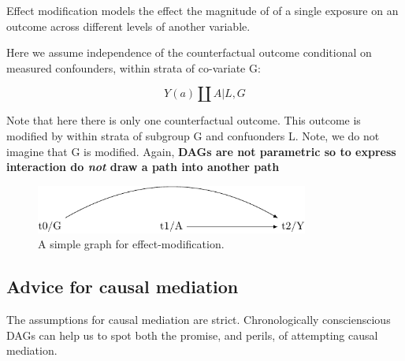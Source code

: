 \documentclass[
  singlecolumn]{report}
\begin{document}
Effect modification models the effect the magnitude of of a single
exposure on an outcome across different levels of another variable.

Here we assume independence of the counterfactual outcome conditional on
measured confounders, within strata of co-variate G:

\[Y(a) \coprod A | L, G\]

Note that here there is only one counterfactual outcome. This outcome is
modified by within strata of subgroup G and confuonders L. Note, we do
not imagine that G is modified. Again, \textbf{DAGs are not parametric
so to express interaction do \emph{not} draw a path into another path}

\begin{figure}

{\centering \includegraphics[width=0.8\textwidth,height=\textheight]{causal-dags_files/figure-pdf/fig-dag-effect-modfication-1.pdf}

}

\caption{\label{fig-dag-effect-modfication}A simple graph for
effect-modification.}

\end{figure}

\hypertarget{advice-for-causal-mediation}{%
\subsection{Advice for causal
mediation}\label{advice-for-causal-mediation}}

The assumptions for causal mediation are strict. Chronologically
conscienscious DAGs can help us to spot both the promise, and perils, of
attempting causal mediation.
\end{document}
